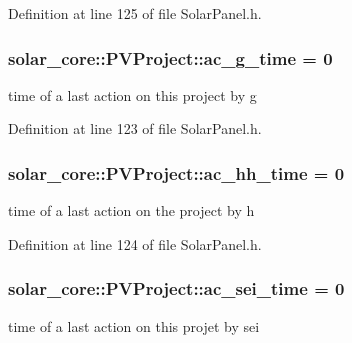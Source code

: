 Definition at line 125 of file Solar\+Panel.\+h.

\hypertarget{classsolar__core_1_1_p_v_project_a9be23309024672b4be445f68c73e42a6}{}
\subsubsection[{ac\+\_\+g\+\_\+time}]{ solar\+\_\+core\+::\+P\+V\+Project\+::ac\+\_\+g\+\_\+time = 0}\label{classsolar__core_1_1_p_v_project_a9be23309024672b4be445f68c73e42a6}
time of a last action on this project by g 

Definition at line 123 of file Solar\+Panel.\+h.

\hypertarget{classsolar__core_1_1_p_v_project_ab6196935ca6f777b28a944642efdbf84}{}
\subsubsection[{ac\+\_\+hh\+\_\+time}]{ solar\+\_\+core\+::\+P\+V\+Project\+::ac\+\_\+hh\+\_\+time = 0}\label{classsolar__core_1_1_p_v_project_ab6196935ca6f777b28a944642efdbf84}
time of a last action on the project by h 

Definition at line 124 of file Solar\+Panel.\+h.

\hypertarget{classsolar__core_1_1_p_v_project_a0a78a4b527a897aac39e5572fbb5a842}{}
\subsubsection[{ac\+\_\+sei\+\_\+time}]{ solar\+\_\+core\+::\+P\+V\+Project\+::ac\+\_\+sei\+\_\+time = 0}\label{classsolar__core_1_1_p_v_project_a0a78a4b527a897aac39e5572fbb5a842}
time of a last action on this projet by sei 

